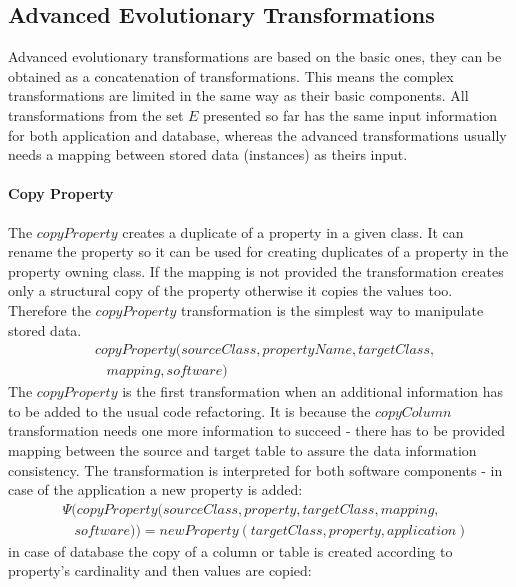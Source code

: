 \documentclass[runningheads]{comsis}
\begin{document}
\subsection{Advanced Evolutionary Transformations}
\label{sec:sw-adv-evolution}
Advanced evolutionary transformations are based on the basic ones, they can be obtained as a concatenation of transformations. This means the complex transformations are limited in the same way as their basic components. All transformations from the set $E$ presented so far has the same input information for both application and database, whereas the advanced transformations usually needs a mapping between stored data (instances) as theirs input. 


\paragraph{Copy Property}
The $copyProperty$ creates a duplicate of a property in a given class. It can rename the property so it can be used for creating duplicates of a property in the property owning class. If the mapping is not provided the transformation creates only a structural copy of the property otherwise it copies the values too. Therefore the  $copyProperty$ transformation is the simplest way to manipulate stored data.
\begin{align}
& copyProperty(sourceClass, propertyName, targetClass, \nonumber  \\
& \; \; \; mapping, software) 
\end{align}
The  $copyProperty$ is the first transformation when an additional information has to be added to the usual code refactoring. It is because the $copyColumn$ transformation needs one more information to succeed - there has to be provided mapping between the source and target table to assure the data information consistency. %
The transformation is interpreted for both software components - in case of the application a new property is added:
\begin{align}
& \Psi(copyProperty(sourceClass, property, targetClass, mapping, \nonumber  \\ 
&  \; \; \; software)) = newProperty(targetClass, property, application) 
\end{align}
in case of database the copy of a column or table is created according to property's cardinality and then values are copied:
\end{document}
